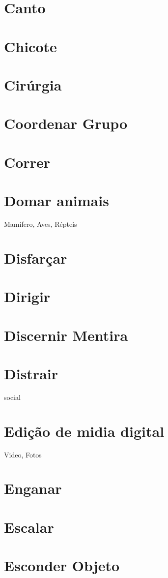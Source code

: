 \section{Canto}
\section{Chicote}
\section{Cirúrgia}
\section{Coordenar Grupo} %
\section{Correr}
\section{Domar animais} Mamifero, Aves, Répteis
\section{Disfarçar}
\section{Dirigir}
\section{Discernir Mentira}
\section{Distrair} social
\section{Edição de midia digital} Video, Fotos
\section{Enganar}
\section{Escalar}
\section{Esconder Objeto}

